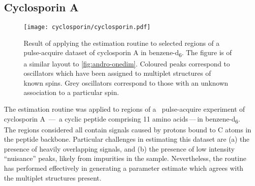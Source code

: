 \subsection{Cyclosporin A}
\begin{figure}
    \texttt{[image: cyclosporin/cyclosporin.pdf]}
    \caption[
        Result of applying the estimation routine to selected regions of a
        pulse-acquire dataset of cyclosporin A.
    ]{
        Result of applying the estimation routine to selected regions of a
        pulse-acquire dataset of cyclosporin A in benzene-d\textsubscript{6}.
        The figure is of a similar layout to \cref{fig:andro-onedim}.
        Coloured peaks correspond to oscillators which have been assigned
        to multiplet structures of known spins. Grey oscillators correspond to
        those with an unknown association to a particular spin.
    }
    \label{fig:cyclosporin}
\end{figure}
The estimation routine was applied to regions of a \proton\ pulse-acquire
experiment of cyclosporin A \,---\, a cyclic
peptide comprising 11 amino acids\,---\,in benzene-d\textsubscript{6}. The
regions considered all contain signals caused by protons bound to
C\textsuperscript{\textalpha} atoms in the peptide backbone\cite{Verma2018}.
Particular challenges in estimating this dataset are (a) the presence of
heavily overlapping signals, and (b) the presence of low intensity ``nuisance''
peaks, likely from impurities in the sample. Nevertheless, the routine has performed
effectively in generating a parameter estimate which agrees with the multiplet
structures present.

